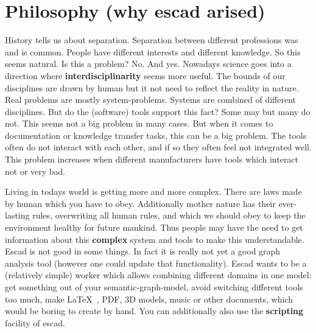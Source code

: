 \documentclass[a4paper, 12pt, openany]{scrbook}
\begin{document}
\section{Philosophy (why escad arised)}
History tells us about separation. Separation between different professions was and is common. People have different interests and different knowledge. So this seems natural. Is this a problem? No. And yes. Nowadays science goes into a direction where \textbf{interdisciplinarity} seems more useful. The bounds of our disciplines are drawn by human but it not need to reflect the reality in nature. Real problems are mostly system-problems. Systems are combined of different disciplines. But do the (software) tools support this fact? Some may but many do not. This seems not a big problem in many cases. But when it comes to documentation or knowledge transfer tasks, this can be a big problem. The tools often do not interact with each other, and if so they often feel not integrated well. This problem increases when different manufacturers have tools which interact not or very bad.

Living in todays world is getting more and more complex. There are laws made by human which you have to obey. Additionally mother nature has their ever-lasting rules, overwriting all human rules, and which we should obey to keep the environment healthy for future mankind. Thus people may have the need to get information about this \textbf{complex} system and tools to make this understandable. Escad is not good in some things. In fact it is really not yet a good graph analysis tool (however one could update that functionality). Escad wants to be a (relatively simple) worker which allows combining different domains in one model: get something out of your semantic-graph-model, avoid switching different tools too much, make \LaTeX\ , PDF, 3D models, music or other documents, which would be boring to create by hand. You can additionally also use the \textbf{scripting} facility of escad.
\end{document}
